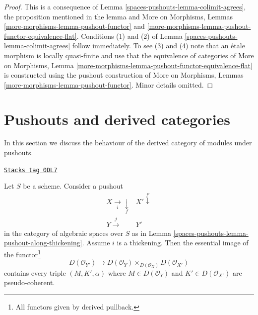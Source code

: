 \begin{proof}
This is a consequence of Lemma \ref{spaces-pushouts-lemma-colimit-agrees}, the proposition
mentioned in the lemma and More on Morphisms, Lemmas
\ref{more-morphisms-lemma-pushout-functor} and
\ref{more-morphisms-lemma-pushout-functor-equivalence-flat}.
Conditions (1) and (2) of Lemma \ref{spaces-pushouts-lemma-colimit-agrees}
follow immediately. To see (3) and (4) note that an \'etale morphism
is locally quasi-finite and use that the equivalence of categories of
More on Morphisms, Lemma
\ref{more-morphisms-lemma-pushout-functor-equivalence-flat}
is constructed using the pushout construction of
More on Morphisms, Lemmas \ref{more-morphisms-lemma-pushout-functor}.
Minor details omitted.
\end{proof}

\section{Pushouts and derived categories}
\label{spaces-pushouts-section-pushouts-derived}
In this section we discuss the behaviour of the derived
category of modules under pushouts.

\begin{lemma}
\label{spaces-pushouts-lemma-pushout-along-thickening-derived}
\href{https://stacks.math.columbia.edu/tag/0DL7}{\texttt{Stacks tag 0DL7}}

Let $S$ be a scheme. Consider a pushout
$$
\begin{array}{cc}X \underset{i}{\longrightarrow}\underset{f}{\downarrow} & X' \overset{f'}{\downarrow} \\ Y \overset{j}{\longrightarrow} & Y'\end{array}
$$
in the category of algebraic spaces over $S$
as in Lemma \ref{spaces-pushouts-lemma-pushout-along-thickening}.
Assume $i$ is a thickening. Then the essential
image of the functor\footnote{All functors given by derived pullback.}
$$
D(\mathcal{O}_{Y'}) \longrightarrow
D(\mathcal{O}_Y) \times_{D(\mathcal{O}_X)} D(\mathcal{O}_{X'})
$$
contains every triple $(M, K', \alpha)$ where $M \in D(\mathcal{O}_Y)$
and $K' \in D(\mathcal{O}_{X'})$ are pseudo-coherent.
\end{lemma}

